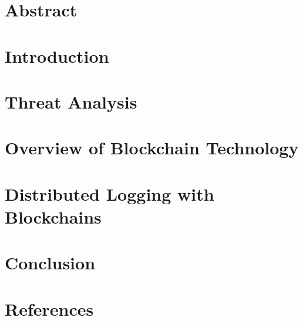 \documentclass[11pt]{article}
\begin{document}

\clearpage


\tableofcontents
\thispagestyle{empty}
\clearpage
\setcounter{page}{1}

\section{Abstract}

\clearpage

\section{Introduction}
\label{sec:intro}

\clearpage

\section{Threat Analysis}
\label{sec:threat}

\clearpage

\section{Overview of Blockchain Technology}
\label{sec:block}

\clearpage

\section{Distributed Logging with Blockchains}
\label{sec:applied}

\clearpage

\section{Conclusion}
\label{sec:conc}

\clearpage

\section{References}
\begingroup
\renewcommand{\section}[2]{}%

\endgroup
\end{document}
